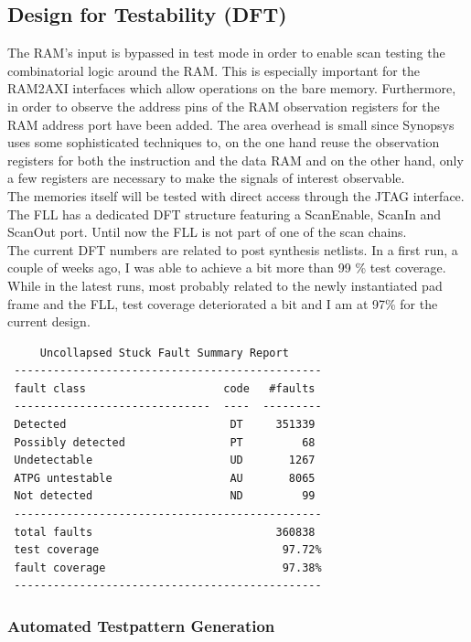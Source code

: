 \subsection{Design for Testability (DFT)}

The RAM's input is bypassed in test mode in order to enable scan testing the combinatorial logic around the RAM. This is especially important for the RAM2AXI interfaces which allow operations on the bare memory. Furthermore, in order to observe the address pins of the RAM observation registers for the RAM address port have been added. The area overhead is small since Synopsys uses some sophisticated techniques to, on the one hand reuse the observation registers for both the instruction and the data RAM and on the other hand, only a few registers are necessary to make the signals of interest observable. \\
The memories itself will be tested with direct access through the JTAG interface. \\
The FLL has a dedicated DFT structure featuring a ScanEnable, ScanIn and ScanOut port. Until now the FLL is not part of one of the scan chains. \\
The current DFT numbers are related to post synthesis netlists. In a first run, a couple of weeks ago, I was able to achieve a bit more than 99 \% test coverage. While in the latest runs, most probably related to the newly instantiated pad frame and the FLL, test coverage deteriorated a bit and I am at 97\% for the current design. \\


\begin{lstlisting}
     Uncollapsed Stuck Fault Summary Report
 -----------------------------------------------
 fault class                     code   #faults
 ------------------------------  ----  ---------
 Detected                         DT     351339
 Possibly detected                PT         68
 Undetectable                     UD       1267
 ATPG untestable                  AU       8065
 Not detected                     ND         99
 -----------------------------------------------
 total faults                            360838
 test coverage                            97.72%
 fault coverage                           97.38%
 -----------------------------------------------
\end{lstlisting}

\subsubsection{Automated Testpattern Generation}

